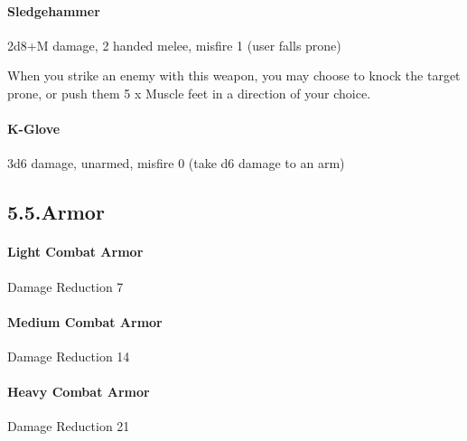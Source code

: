 \documentclass{article}
\begin{document}
\paragraph{Sledgehammer}\label{sec-sledgehammer}%

\noindent{}2d8+M damage, 2 handed melee, misfire 1 (user falls prone)%

When you strike an enemy with this weapon, you may choose to knock the target prone, or push them 5 x Muscle feet in a direction of your choice.%

\paragraph{K-Glove}\label{sec-k-glove}%

\noindent{}3d6 damage, unarmed, misfire 0 (take d6 damage to an arm)%

\subsection{5.5.\hspace*{0.5em}Armor}\label{sec-armor}%

\paragraph{Light Combat Armor}\label{sec-light-combat-armor}%

\noindent{}Damage Reduction 7 %

\paragraph{Medium Combat Armor}\label{sec-medium-combat-armor}%

\noindent{}Damage Reduction 14%

\paragraph{Heavy Combat Armor}\label{sec-heavy-combat-armor}%

\noindent{}Damage Reduction 21%
\end{document}
